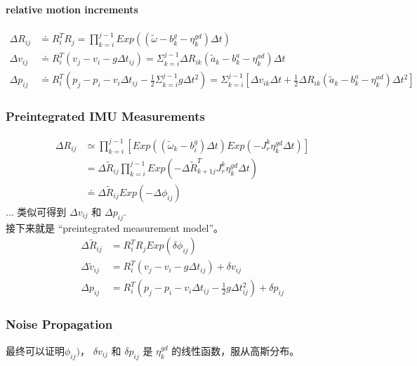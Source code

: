\documentclass[10pt,a4paper]{article}
\begin{document}
\paragraph{relative motion increments}
\begin{subequations}
	\begin{align}
	\Delta R_{ij} & \doteq R_i^T R_j = \prod_{k=i}^{j-1} Exp((\tilde{\omega} - b^g_k - \eta^{gd}_k) \Delta t) \\
	\Delta v_{ij} &\doteq R_i^T(v_j - v_i -g \Delta t_{ij}) = \Sigma_{k=i}^{j-1} \Delta R_{ik}(\tilde{a}_k - b_k^a -\eta_k^{ad}) \Delta t\\
	\Delta p_{ij} &\doteq R_i^T (p_j - p_i - v_i\Delta t_{ij} - \frac{1}{2} \Sigma_{k=i}^{j-1}g\Delta t^2)= 
	\Sigma_{k=i}^{j-1}[\Delta v_{ik}\Delta t + \frac{1}{2}\Delta R_{ik}(\tilde{a}_k - b_k^a -\eta_k^{ad}) \Delta t^2]
	\end{align}
\end{subequations}

\subsubsection{Preintegrated IMU Measurements}
\begin{subequations}
	\begin{align}
	\Delta R_{ij} &\simeq \prod_{k=i}^{j-1}[Exp((\tilde{\omega}_k - b_i^g) \Delta t) 
	Exp(-J_r^k \eta_k^{gd}\Delta t)]\\
	&= \Delta \tilde{R}_{ij} \prod_{k=i}^{j-1}Exp(-\Delta \tilde{R}_{k+1j}^{T} J_r^k \eta_k^{gd} \Delta t)\\
	&\doteq \Delta \tilde{R}_{ij} Exp(-\Delta \phi_{ij})
	\end{align}
\end{subequations}
... 类似可得到 $\Delta v_{ij}$ 和 $\Delta p_{ij}$.\\
接下来就是 “preintegrated measurement model”。
\begin{subequations}
	\begin{align}
		\Delta \tilde{R}_{ij} &= R_i^T R_j Exp(\delta \phi_{ij}) \\
		\Delta \tilde{v}_{ij} &= R_i^T(v_j - v_i -g \Delta t_{ij}) + \delta v_{ij}\\
		\Delta p_{ij}         &= R_i^T (p_j - p_i - v_i\Delta t_{ij} - \frac{1}{2} g\Delta t_{ij}^2) + \delta p_{ij}
	\end{align}
\end{subequations}

\subsubsection{Noise Propagation}
最终可以证明$\phi_{ij})$， $\delta v_{ij}$ 和 $\delta p_{ij}$ 是 $\eta_k^{gd}$ 的线性函数，服从高斯分布。
\end{document}
